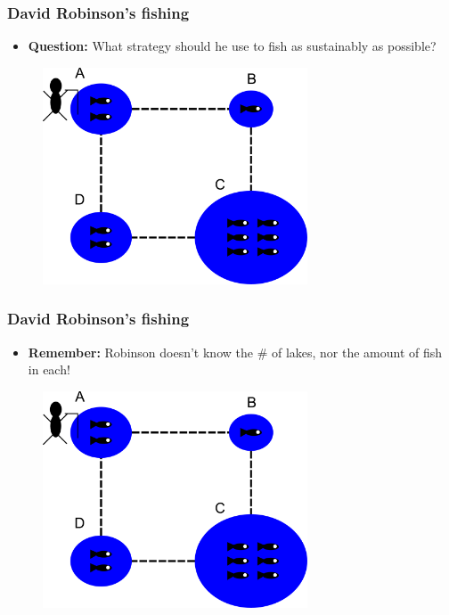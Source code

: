 \documentclass[handout]{beamer}
\begin{document}
\begin{frame}
\frametitle{David Robinson's fishing}

\begin{itemize}
\item<2-> \textbf{Question:} What strategy should he use to fish as sustainably as possible?
\end{itemize}

\begin{figure}[ht]
\centerline{\includegraphics[width=0.7\textwidth]{animations_figures/lec4_fishMetropolis.pdf}}
\end{figure}

\end{frame}

\begin{frame}
\frametitle{David Robinson's fishing}

\begin{itemize}
\item<2-> \textbf{Remember:} Robinson doesn't know the \# of lakes, nor the amount of fish in each!
\end{itemize}

\begin{figure}[ht]
\centerline{\includegraphics[width=0.7\textwidth]{animations_figures/lec4_fishMetropolis.pdf}}
\end{figure}

\end{frame}
\end{document}
